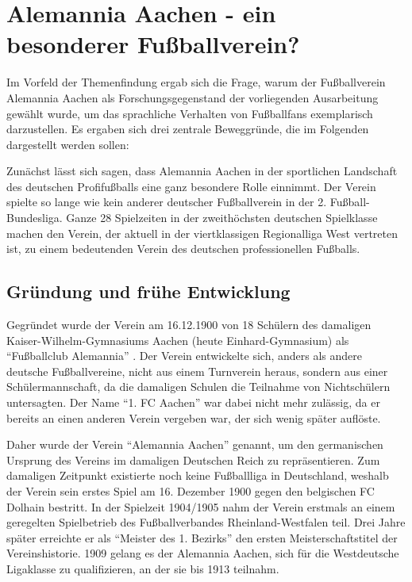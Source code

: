 \section{Alemannia Aachen - ein besonderer Fußballverein?}
Im Vorfeld der Themenfindung ergab sich die Frage, warum der Fußballverein Alemannia Aachen als Forschungsgegenstand der vorliegenden Ausarbeitung gewählt wurde, um das sprachliche
Verhalten von Fußballfans exemplarisch darzustellen.
Es ergaben sich drei zentrale Beweggründe, die im Folgenden dargestellt werden sollen:

Zunächst lässt sich sagen, dass Alemannia Aachen in der sportlichen Landschaft des deutschen Profifußballs eine ganz besondere Rolle einnimmt.
Der Verein spielte so lange wie kein anderer deutscher Fußballverein in der 2. Fußball-Bundesliga.
Ganze 28 Spielzeiten in der zweithöchsten deutschen Spielklasse machen den Verein, der aktuell in der viertklassigen Regionalliga West vertreten ist, zu einem bedeutenden Verein des deutschen professionellen Fußballs.

\subsection{Gründung und frühe Entwicklung}
Gegründet wurde der Verein am 16.12.1900 von 18 Schülern des damaligen Kaiser-Wilhelm-Gymnasiums Aachen (heute Einhard-Gymnasium) als "`Fußballclub Alemannia"' \cite{AA14}.
Der Verein entwickelte sich, anders als andere deutsche Fußballvereine, nicht aus einem Turnverein heraus, sondern aus einer Schülermannschaft, da die damaligen Schulen die Teilnahme von Nichtschülern untersagten.
Der Name "`1. FC Aachen"' war dabei nicht mehr zulässig, da er bereits an einen anderen Verein vergeben war, der sich wenig später auflöste.

Daher wurde der Verein "`Alemannia Aachen"' genannt, um den germanischen Ursprung des Vereins im damaligen Deutschen Reich zu repräsentieren.
Zum damaligen Zeitpunkt existierte noch keine Fußballliga in Deutschland, weshalb der Verein sein erstes Spiel am 16. Dezember 1900 gegen den belgischen FC Dolhain bestritt.
In der Spielzeit 1904/1905 nahm der Verein erstmals an einem geregelten Spielbetrieb des Fußballverbandes Rheinland-Westfalen teil.
Drei Jahre später erreichte er als "`Meister des 1. Bezirks"' den ersten Meisterschaftstitel der Vereinshistorie.
1909 gelang es der Alemannia Aachen, sich für die Westdeutsche Ligaklasse zu qualifizieren, an der sie bis 1913 teilnahm.


